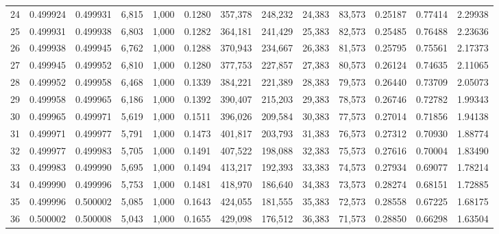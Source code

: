 \begin{tabular}{rrrrrrrrrrrrr}
24  &  0.499924 &  0.499931 &   6,815 &  1,000 &                                     0.1280 &  357,378 &  248,232 &   24,383 &   83,573 &  0.25187 &  0.77414 &  2.29938 \\
25  &  0.499931 &  0.499938 &   6,803 &  1,000 &                                     0.1282 &  364,181 &  241,429 &   25,383 &   82,573 &  0.25485 &  0.76488 &  2.23636 \\
26  &  0.499938 &  0.499945 &   6,762 &  1,000 &                                     0.1288 &  370,943 &  234,667 &   26,383 &   81,573 &  0.25795 &  0.75561 &  2.17373 \\
27  &  0.499945 &  0.499952 &   6,810 &  1,000 &                                     0.1280 &  377,753 &  227,857 &   27,383 &   80,573 &  0.26124 &  0.74635 &  2.11065 \\
28  &  0.499952 &  0.499958 &   6,468 &  1,000 &                                     0.1339 &  384,221 &  221,389 &   28,383 &   79,573 &  0.26440 &  0.73709 &  2.05073 \\
29  &  0.499958 &  0.499965 &   6,186 &  1,000 &                                     0.1392 &  390,407 &  215,203 &   29,383 &   78,573 &  0.26746 &  0.72782 &  1.99343 \\
30  &  0.499965 &  0.499971 &   5,619 &  1,000 &                                     0.1511 &  396,026 &  209,584 &   30,383 &   77,573 &  0.27014 &  0.71856 &  1.94138 \\
31  &  0.499971 &  0.499977 &   5,791 &  1,000 &                                     0.1473 &  401,817 &  203,793 &   31,383 &   76,573 &  0.27312 &  0.70930 &  1.88774 \\
32  &  0.499977 &  0.499983 &   5,705 &  1,000 &                                     0.1491 &  407,522 &  198,088 &   32,383 &   75,573 &  0.27616 &  0.70004 &  1.83490 \\
33  &  0.499983 &  0.499990 &   5,695 &  1,000 &                                     0.1494 &  413,217 &  192,393 &   33,383 &   74,573 &  0.27934 &  0.69077 &  1.78214 \\
34  &  0.499990 &  0.499996 &   5,753 &  1,000 &                                     0.1481 &  418,970 &  186,640 &   34,383 &   73,573 &  0.28274 &  0.68151 &  1.72885 \\
35  &  0.499996 &  0.500002 &   5,085 &  1,000 &                                     0.1643 &  424,055 &  181,555 &   35,383 &   72,573 &  0.28558 &  0.67225 &  1.68175 \\
36  &  0.500002 &  0.500008 &   5,043 &  1,000 &                                     0.1655 &  429,098 &  176,512 &   36,383 &   71,573 &  0.28850 &  0.66298 &  1.63504 \\

\end{tabular}

